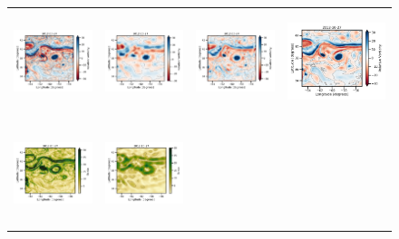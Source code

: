 \begin{figure}[t!]
\begin{center}
\begin{tabular}{cccc}
\vspace{-2mm}
\includegraphics[trim={0 0 42mm 0},clip, width=3.20cm,height=3cm]{content/figures/maps/rvort/dc20a/nadir4/dc20a_nemo_vort_r.png} &
\includegraphics[trim={0 0 42mm 0},clip, width=3.2cm,height=3cm]{content/figures/maps/rvort/dc20a/nadir4/dc20a_miost_vort_r.png} &
\includegraphics[trim={0 0 42mm 0},clip, width=3.2cm,height=3cm]{content/figures/maps/rvort/dc20a/nadir4/dc20a_bfnqg_vort_r.png} &
\includegraphics[width=4.0cm,height=3cm]{content/figures/maps/rvort/dc20a/nadir4/dc20a_4dvarnet_vort_r.png}  \\
\includegraphics[trim={0 0 38mm 0},clip, width=3.20cm,height=3cm]{content/figures/maps/strain/dc20a/nadir4/dc20a_nemo_strain.png} &
\includegraphics[trim={0 0 38mm 0},clip, width=3.2cm,height=3cm]{content/figures/maps/strain/dc20a/nadir4/dc20a_miost_strain.png} &

\end{tabular}
\end{center}
\end{figure}
